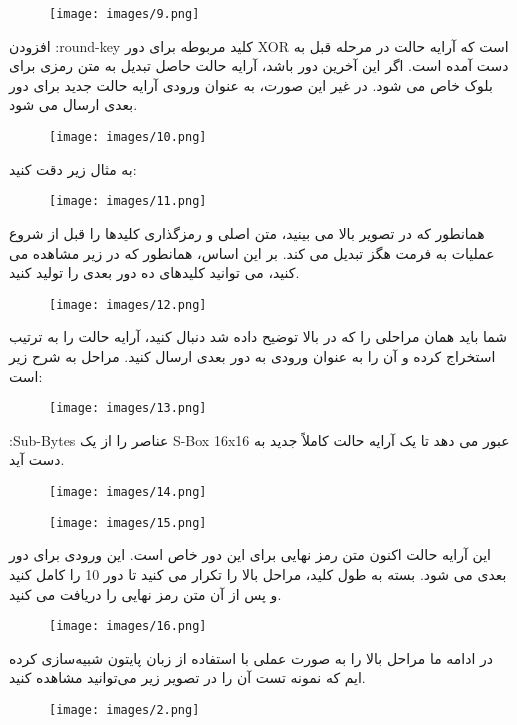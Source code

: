 \begin{figure}[H]
    \centering
    \texttt{[image: images/9.png]}
\end{figure}
افزودن :round-key کلید مربوطه برای دور XOR است که آرایه حالت در مرحله قبل به دست آمده است. اگر این آخرین دور باشد، آرایه حالت حاصل تبدیل به متن رمزی برای بلوک خاص می شود. در غیر این صورت، به عنوان ورودی آرایه حالت جدید برای دور بعدی ارسال می شود.
\begin{figure}[H]
    \centering
    \texttt{[image: images/10.png]}
\end{figure}
به مثال زیر دقت کنید:
\begin{figure}[H]
    \centering
    \texttt{[image: images/11.png]}
\end{figure}
همانطور که در تصویر بالا می بینید، متن اصلی و رمزگذاری کلیدها را قبل از شروع عملیات به فرمت هگز تبدیل می کند. بر این اساس، همانطور که در زیر مشاهده می کنید، می توانید کلیدهای ده دور بعدی را تولید کنید.
\begin{figure}[H]
    \centering
    \texttt{[image: images/12.png]}
\end{figure}
شما باید همان مراحلی را که در بالا توضیح داده شد دنبال کنید، آرایه حالت را به ترتیب استخراج کرده و آن را به عنوان ورودی به دور بعدی ارسال کنید. مراحل به شرح زیر است:
\begin{figure}[H]
    \centering
    \texttt{[image: images/13.png]}
\end{figure}
:Sub-Bytes عناصر را از یک S-Box 16x16 عبور می دهد تا یک آرایه حالت کاملاً جدید به دست آید.
\begin{figure}[H]
    \centering
    \texttt{[image: images/14.png]}
\end{figure}
\begin{figure}[H]
    \centering
    \texttt{[image: images/15.png]}
\end{figure}
این آرایه حالت اکنون متن رمز نهایی برای این دور خاص است. این ورودی برای دور بعدی می شود. بسته به طول کلید، مراحل بالا را تکرار می کنید تا دور 10 را کامل کنید و پس از آن متن رمز نهایی را دریافت می کنید.
\begin{figure}[H]
    \centering
    \texttt{[image: images/16.png]}
\end{figure}
در ادامه ما مراحل بالا را به صورت عملی با استفاده از زبان پایتون شبیه‌سازی کرده ایم که نمونه تست آن را در تصویر زیر می‌توانید مشاهده کنید.
\begin{figure}[H]
    \centering
    \texttt{[image: images/2.png]}
\end{figure}